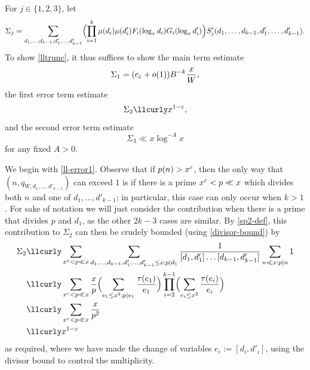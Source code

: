 For $j\in\{1,2,3\}$, let
\begin{equation}
 \Sigma_j= \sum_{d_1,\dots,d_{k-1},d'_1,\dots,d'_{k-1}}\Bigl(\prod_{i=1}^k \mu(d_{i}) \mu(d'_{i}) F_{i}(\log_x d_{i}) G_{i}(\log_x d'_{i})\Bigr) S'_j(d_1,\dots,d_{k-1},d'_1,\dots,d'_{k-1}).
\label{eq:SigmaDef}
\end{equation}
To show \eqref{lltrunc}, it thus suffices to show the main term estimate
\begin{equation}\label{ll-main}
 \Sigma_1= (c_\varepsilon + o(1)) B^{-k} \frac{x}{W},
\end{equation}
the first error term estimate
\begin{equation}\label{ll-error1}
\Sigma_2 \lessapprox x^{1-\eps},
\end{equation}
and the second error term estimate
\begin{equation}\label{ll-error2}
\Sigma_3 \ll x \log^{-A} x
\end{equation}
for any fixed $A>0$.

We begin with \eqref{ll-error1}.  Observe that if $p(n) > x^\varepsilon$, then the only way that $(n,q_{W,d_1,\dots,d'_{k-1}})$ can exceed $1$ is if there is a prime $x^\varepsilon < p \ll x$ which divides both $n$ and one of $d_1,\dots,d'_{k-1}$; in particular, this case can only occur when $k > 1$.  For sake of notation we will just consider the contribution when there is a prime that divides $p$ and $d_1$, as the other $2k-3$ cases are similar.  By \eqref{sp2-def}, this contribution to $\Sigma_2$ can then be crudely bounded (using \eqref{divisor-bound}) by
\begin{align*}
 \Sigma_2&\lessapprox \sum_{x^\eps < p \ll x} \sum_{d_1,\dots,d_{k-1},d'_1,\dots,d'_{k-1} \leq x; p|d_1} \frac{1}{[d_1,d'_1] \dots [d_{k-1},d'_{k-1}]} \sum_{n \ll x: p|n} 1 \\
&\lessapprox \sum_{x^\eps < p \ll x} \frac{x}{p} \Bigl(\sum_{e_1 \leq x^2; p|e_1} \frac{\tau(e_1)}{e_1}\Bigr) \prod_{i=2}^{k-1} \Bigl(\sum_{e_i \leq x^2} \frac{\tau(e_i)}{e_i}\Bigr) \\
&\lessapprox \sum_{x^\eps < p \ll x} \frac{x}{p^2} \\
&\lessapprox x^{1-\eps}
\end{align*}
as required, where we have made the change of variables $e_i := [d_i,d'_i]$, using the divisor bound to control the multiplicity.  

